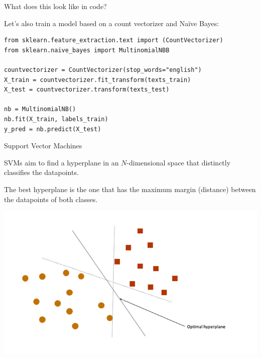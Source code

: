 \documentclass[compress]{beamer}
\begin{document}
\begin{frame}[fragile]{What does this look like in code?}
	
Let's also train a model based on a count vectorizer and Naïve Bayes:
	
\begin{lstlisting}
from sklearn.feature_extraction.text import (CountVectorizer)
from sklearn.naive_bayes import MultinomialNBB
		
countvectorizer = CountVectorizer(stop_words="english")
X_train = countvectorizer.fit_transform(texts_train)
X_test = countvectorizer.transform(texts_test)
		
nb = MultinomialNB()
nb.fit(X_train, labels_train)
y_pred = nb.predict(X_test)
\end{lstlisting}
	
\end{frame}


\begin{frame}{Support Vector Machines}
	
SVMs aim to find a hyperplane in an \(N\)-dimensional space that distinctly classifies the datapoints. 
	
The best hyperplane is the one that has the maximum margin (distance) between the datapoints of both classes.
	
\begin{center}
	\includegraphics[width=\linewidth,height=0.5\textheight,keepaspectratio]{../pictures/optimal_hyperplane.png} \\\
\end{center}
	
\end{frame}
\end{document}
